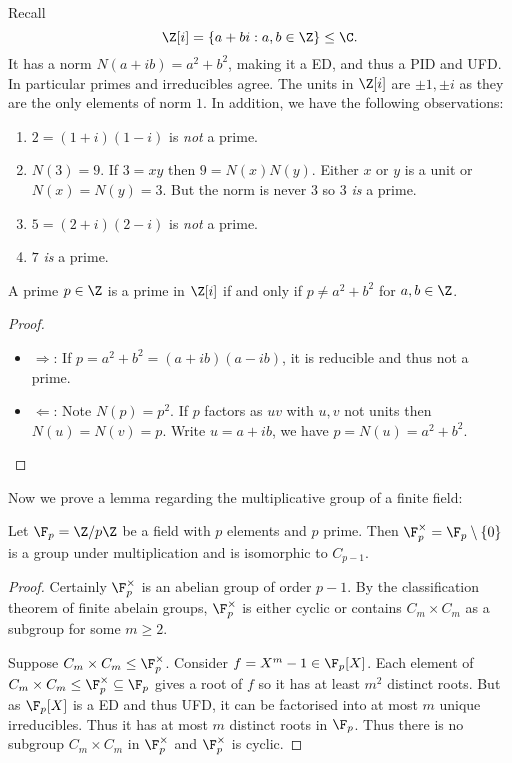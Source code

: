 \documentclass[a4paper]{article}
\theoremstyle{definition}
\begin{document}
Recall
\[
  \Z[i] = \{a + bi: a, b \in \Z\} \leq \C.
\]
It has a norm \(N(a + ib) = a^2 + b^2\), making it a ED, and thus a PID and UFD. In particular primes and irreducibles agree. The units in \(\Z[i]\) are \(\pm 1, \pm i\) as they are the only elements of norm \(1\). In addition, we have the following observations:
\begin{enumerate}
\item \(2 = (1 + i)(1 - i)\) is \emph{not} a prime.
\item \(N(3) = 9\). If \(3 = xy\) then \(9 = N(x)N(y)\). Either \(x\) or \(y\) is a unit or \(N(x) = N(y) = 3\). But the norm is never \(3\) so \(3\) \emph{is} a prime.
\item \(5 = (2 + i)(2 - i)\) is \emph{not} a prime.
\item \(7\) \emph{is} a prime.
\end{enumerate}

\begin{proposition}
  A prime \(p \in \Z\) is a prime in \(\Z[i]\) if and only if \(p \neq a^2 + b^2\) for \(a, b \in \Z\).
\end{proposition}

\begin{proof}\leavevmode
  \begin{itemize}
  \item \(\Rightarrow\): If \(p = a^2 + b^2 = (a + ib)(a - ib)\), it is reducible and thus not a prime.
  \item \(\Leftarrow\): Note \(N(p) = p^2\). If \(p\) factors as \(uv\) with \(u, v\) not units then \(N(u) = N(v) = p\). Write \(u = a + ib\), we have \(p = N(u) = a^2 + b^2\).
  \end{itemize}
\end{proof}

Now we prove a lemma regarding the multiplicative group of a finite field:

\begin{lemma}
  Let \(\F_p = \Z/p\Z\) be a field with \(p\) elements and \(p\) prime. Then \(\F_p^\times = \F_p \setminus \{0\}\) is a group under multiplication and is isomorphic to \(C_{p - 1}\).
\end{lemma}

\begin{proof}
  Certainly \(\F_p^\times\) is an abelian group of order \(p - 1\). By the classification theorem of finite abelain groups, \(\F_p^\times\) is either cyclic or contains \(C_m \times C_m\) as a subgroup for some \(m \geq 2\).

  Suppose \(C_m \times C_m \leq \F_p^\times\). Consider \(f = X^m - 1 \in \F_p[X]\). Each element of \(C_m \times C_m \leq \F_p^\times \subseteq \F_p\) gives a root of \(f\) so it has at least \(m^2\) distinct roots. But as \(\F_p[X]\) is a ED and thus UFD, it can be factorised into at most \(m\) unique irreducibles. Thus it has at most \(m\) distinct roots in \(\F_p\). Thus there is no subgroup \(C_m \times C_m\) in \(\F_p^\times\) and \(\F_p^\times\) is cyclic.
\end{proof}
\end{document}
